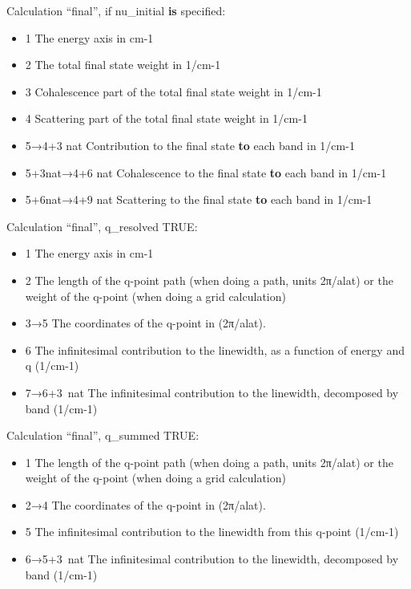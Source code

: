 \documentclass[
]{article}
\providecommand{\tightlist}{%
  \setlength{\itemsep}{0pt}\setlength{\parskip}{0pt}}
\begin{document}
Calculation \enquote{final}, if nu\_initial \textbf{is} specified:

\begin{itemize}
\tightlist
\item
  1 The energy axis in cm-1
\item
  2 The total final state weight in 1/cm-1
\item
  3 Cohalescence part of the total final state weight in 1/cm-1
\item
  4 Scattering part of the total final state weight in 1/cm-1
\item
  5→4+3 nat Contribution to the final state \textbf{to} each band in
  1/cm-1
\item
  5+3nat→4+6 nat Cohalescence to the final state \textbf{to} each band
  in 1/cm-1
\item
  5+6nat→4+9 nat Scattering to the final state \textbf{to} each band in
  1/cm-1
\end{itemize}

Calculation \enquote{final}, q\_resolved TRUE:

\begin{itemize}
\tightlist
\item
  1 The energy axis in cm-1
\item
  2 The length of the q-point path (when doing a path, units 2π/alat) or
  the weight of the q-point (when doing a grid calculation)
\item
  3→5 The coordinates of the q-point in (2π/alat).
\item
  6 The infinitesimal contribution to the linewidth, as a function of
  energy and q (1/cm-1)
\item
  7→6+3~nat The infinitesimal contribution to the linewidth, decomposed
  by band (1/cm-1)
\end{itemize}

Calculation \enquote{final}, q\_summed TRUE:

\begin{itemize}
\tightlist
\item
  1 The length of the q-point path (when doing a path, units 2π/alat) or
  the weight of the q-point (when doing a grid calculation)
\item
  2→4 The coordinates of the q-point in (2π/alat).
\item
  5 The infinitesimal contribution to the linewidth from this q-point
  (1/cm-1)
\item
  6→5+3~nat The infinitesimal contribution to the linewidth, decomposed
  by band (1/cm-1)
\end{itemize}
\end{document}
